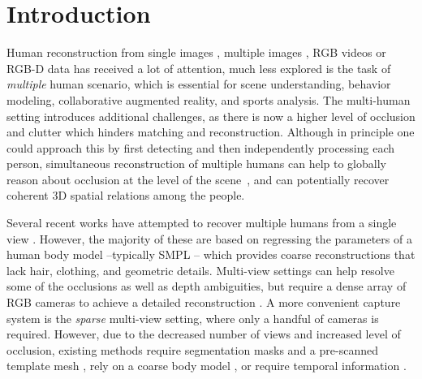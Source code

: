 \section{Introduction}
\label{sec:intro}

Human reconstruction from single images \cite{choutas2020monocular, kanazawa2018end,liu2022recent}, multiple images \cite{guo2019relightables, collet2015high}, RGB videos \cite{alldieck2018detailed,Kocabas20} or RGB-D data \cite{yu2017bodyfusion,yu2018doublefusion} has received a lot of attention, much less explored is the task of \emph{multiple} human scenario, which is essential for scene understanding, behavior modeling, collaborative augmented reality, and sports analysis.  
%
The multi-human setting introduces additional challenges, as there is now a higher level of occlusion and clutter 
which hinders matching and reconstruction. 
Although in principle one could approach this by first detecting and then independently processing each person, 
simultaneous reconstruction of multiple humans can help to globally reason about occlusion at the level of the scene~\cite{jiang2020coherent, sun2022putting}, 
and can potentially recover coherent 3D spatial relations among the people.

Several recent works have attempted to recover multiple humans from a single view \cite{choi2022learning, sun2022putting, sun2021monocular, zanfir2018deep, zanfir2018monocular, fieraru2020three, jiang2020coherent, zhang2021body, ugrinovic2021body,mustafa2021multi}. However, the majority of these are based on regressing the parameters of a human body model --typically SMPL \cite{loper2015smpl}--
which provides coarse reconstructions that %
lack hair, clothing, and geometric details. 
Multi-view settings can help resolve some of the occlusions as well as depth ambiguities, but require a dense array of RGB cameras to achieve a detailed reconstruction \cite{collet2015high, joo2015panoptic,vlasic2009dynamic}.
A more convenient capture system %
is the \emph{sparse} multi-view setting, where only a handful of cameras is required.
However, due to the decreased number of views and increased level of occlusion, 
existing methods require segmentation masks and a pre-scanned template mesh \cite{liu2011markerless, wu2013set}, rely on a coarse body model \cite{zhang2021lightweight, huang2021dynamic}, or require temporal information \cite{zheng2021deepmulticap, huang2021dynamic}.

